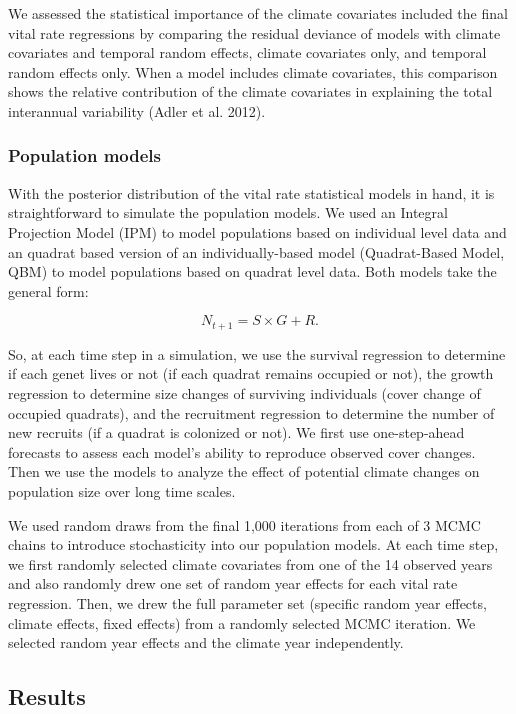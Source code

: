 \documentclass[12pt,]{article}
\begin{document}
We assessed the statistical importance of the climate covariates
included the final vital rate regressions by comparing the residual
deviance of models with climate covariates and temporal random effects,
climate covariates only, and temporal random effects only. When a model
includes climate covariates, this comparison shows the relative
contribution of the climate covariates in explaining the total
interannual variability (Adler et al. 2012).

\subsubsection{Population models}\label{population-models}

With the posterior distribution of the vital rate statistical models in
hand, it is straightforward to simulate the population models. We used
an Integral Projection Model (IPM) to model populations based on
individual level data and an quadrat based version of an
individually-based model (Quadrat-Based Model, QBM) to model populations
based on quadrat level data. Both models take the general form:

\begin{equation}
N_{t+1} = S \times G + R.
\end{equation}

So, at each time step in a simulation, we use the survival regression to
determine if each genet lives or not (if each quadrat remains occupied
or not), the growth regression to determine size changes of surviving
individuals (cover change of occupied quadrats), and the recruitment
regression to determine the number of new recruits (if a quadrat is
colonized or not). We first use one-step-ahead forecasts to assess each
model's ability to reproduce observed cover changes. Then we use the
models to analyze the effect of potential climate changes on population
size over long time scales.

We used random draws from the final 1,000 iterations from each of 3 MCMC
chains to introduce stochasticity into our population models. At each
time step, we first randomly selected climate covariates from one of the
14 observed years and also randomly drew one set of random year effects
for each vital rate regression. Then, we drew the full parameter set
(specific random year effects, climate effects, fixed effects) from a
randomly selected MCMC iteration. We selected random year effects and
the climate year independently.

\subsection{Results}\label{results}
\end{document}
